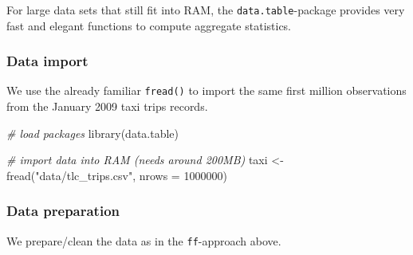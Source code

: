 \documentclass[
  12pt,
]{style/krantz}
\newenvironment{Shaded}{\begin{snugshade}}{\end{snugshade}}
\newcommand{\AttributeTok}[1]{\textcolor[rgb]{0.77,0.63,0.00}{#1}}
\newcommand{\CommentTok}[1]{\textcolor[rgb]{0.56,0.35,0.01}{\textit{#1}}}
\newcommand{\DecValTok}[1]{\textcolor[rgb]{0.00,0.00,0.81}{#1}}
\newcommand{\FunctionTok}[1]{\textcolor[rgb]{0.00,0.00,0.00}{#1}}
\newcommand{\NormalTok}[1]{#1}
\newcommand{\OtherTok}[1]{\textcolor[rgb]{0.56,0.35,0.01}{#1}}
\newcommand{\StringTok}[1]{\textcolor[rgb]{0.31,0.60,0.02}{#1}}
\begin{document}
For large data sets that still fit into RAM, the \texttt{data.table}-package provides very fast and elegant functions to compute aggregate statistics.

\hypertarget{data-import-3}{%
\subsubsection{Data import}\label{data-import-3}}

We use the already familiar \texttt{fread()} to import the same first million observations from the January 2009 taxi trips records.

\begin{Shaded}
\begin{Highlighting}[]
\CommentTok{\# load packages}
\FunctionTok{library}\NormalTok{(data.table)}

\CommentTok{\# import data into RAM (needs around 200MB)}
\NormalTok{taxi }\OtherTok{\textless{}{-}} \FunctionTok{fread}\NormalTok{(}\StringTok{"data/tlc\_trips.csv"}\NormalTok{,}
              \AttributeTok{nrows =} \DecValTok{1000000}\NormalTok{)}
\end{Highlighting}
\end{Shaded}

\hypertarget{data-preparation}{%
\subsubsection{Data preparation}\label{data-preparation}}

We prepare/clean the data as in the \texttt{ff}-approach above.
\end{document}
